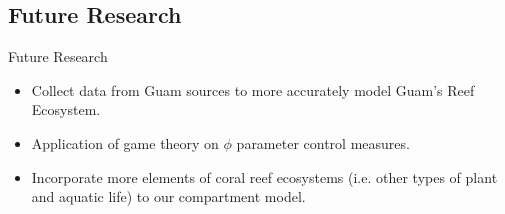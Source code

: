 \documentclass{beamer}
\begin{document}
\subsection{Future Research}
\begin{frame}{Future Research}
    \begin{itemize}
    \item Collect data from Guam sources to more accurately model Guam's Reef Ecosystem.
    \item Application of game theory on $\phi$ parameter control measures.
    \item Incorporate more elements of coral reef ecosystems (i.e. other types of plant and aquatic life) to our compartment model.
    \end{itemize} 
\end{frame}
\end{document}

